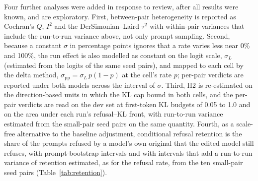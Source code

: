 Four further analyses were added in response to review, after all results were
known, and are exploratory. First, between-pair heterogeneity is reported as
Cochran's $Q$, $I^2$ and the DerSimonian--Laird $\tau^2$ with within-pair
variances that include the run-to-run variance above, not only prompt
sampling. Second, because a constant $\sigma$ in percentage points ignores
that a rate varies less near 0\% and 100\%, the run effect is also modelled
as constant on the logit scale, $\sigma_L$ (estimated from the logits of the
same seed pairs), and mapped to each cell by the delta method,
$\sigma_{\mathrm{pp}}=\sigma_L\,p(1-p)$ at the cell's rate $p$; per-pair
verdicts are reported under both models across the interval of $\sigma$.
Third, H2 is re-estimated on the direction-based units in which the KL cap
bound in both cells, and the per-pair verdicts are read on the dev set at
first-token KL budgets of 0.05 to 1.0 and on the area under each run's
refusal--KL front, with run-to-run variance estimated from the small-pair seed
pairs on the same quantity. Fourth, as a scale-free alternative to the
baseline adjustment, conditional refusal retention is the share of the prompts
refused by a model's own original that the edited model still refuses, with
prompt-bootstrap intervals and with intervals that add a run-to-run variance
of retention estimated, as for the refusal rate, from the ten small-pair seed
pairs (Table~\ref{tab:retention}).

